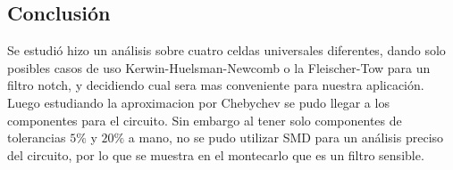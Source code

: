 \subsection{Conclusión}

Se estudió hizo un análisis sobre cuatro celdas universales diferentes, dando solo posibles casos de uso Kerwin-Huelsman-Newcomb o la Fleischer-Tow para un filtro notch, y decidiendo cual sera mas conveniente para nuestra aplicación. Luego estudiando la aproximacion por Chebychev se pudo llegar a los componentes para el circuito. Sin embargo al tener solo componentes de tolerancias $5\%$ y $20\%$ a mano, no se pudo utilizar SMD para un análisis preciso del circuito, por lo que se muestra en el montecarlo que es un filtro sensible. 

